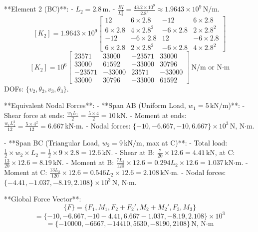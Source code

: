 **Element 2 (BC)**:
- \( L_2 = 2.8 \, \text{m} \).
- \( \frac{E I}{L_2^3} = \frac{43.2 \times 10^9}{2.8^3} \approx 1.9643 \times 10^9 \, \text{N/m} \).
\[
[K_2] = 1.9643 \times 10^9 \begin{bmatrix}
12 & 6 \times 2.8 & -12 & 6 \times 2.8 \\
6 \times 2.8 & 4 \times 2.8^2 & -6 \times 2.8 & 2 \times 2.8^2 \\
-12 & -6 \times 2.8 & 12 & -6 \times 2.8 \\
6 \times 2.8 & 2 \times 2.8^2 & -6 \times 2.8 & 4 \times 2.8^2
\end{bmatrix}
\]
\[
[K_2] = 10^6 \begin{bmatrix}
23571 & 33000 & -23571 & 33000 \\
33000 & 61592 & -33000 & 30796 \\
-23571 & -33000 & 23571 & -33000 \\
33000 & 30796 & -33000 & 61592
\end{bmatrix} \, \text{N/m or N·m}
\]
DOFs: \( \{ v_2, \theta_2, v_3, \theta_3 \} \).

**Equivalent Nodal Forces**:
- **Span AB (Uniform Load, \( w_1 = 5 \, \text{kN/m} \))**:
  - Shear force at ends: \( \frac{w_1 L_1}{2} = \frac{5 \times 4}{2} = 10 \, \text{kN} \).
  - Moment at ends: \( \frac{w_1 L_1^2}{12} = \frac{5 \times 4^2}{12} = 6.667 \, \text{kN·m} \).
  - Nodal forces: \( \{ -10, -6.667, -10, 6.667 \} \times 10^3 \, \text{N, N·m} \).

- **Span BC (Triangular Load, \( w_2 = 9 \, \text{kN/m} \), max at C)**:
  - Total load: \( \frac{1}{2} \times w_2 \times L_2 = \frac{1}{2} \times 9 \times 2.8 = 12.6 \, \text{kN} \).
  - Shear at B: \( \frac{7}{20} \times 12.6 = 4.41 \, \text{kN} \), at C: \( \frac{13}{20} \times 12.6 = 8.19 \, \text{kN} \).
  - Moment at B: \( \frac{7 L_2}{120} \times 12.6 = 0.294 L_2 \times 12.6 = 1.037 \, \text{kN·m} \).
  - Moment at C: \( \frac{13 L_2}{120} \times 12.6 = 0.546 L_2 \times 12.6 = 2.108 \, \text{kN·m} \).
  - Nodal forces: \( \{ -4.41, -1.037, -8.19, 2.108 \} \times 10^3 \, \text{N, N·m} \).

**Global Force Vector**:
\[
\{ F \} = \{ F_1, M_1, F_2 + F_2', M_2 + M_2', F_3, M_3 \}
\]
\[
= \{ -10, -6.667, -10 - 4.41, 6.667 - 1.037, -8.19, 2.108 \} \times 10^3
\]
\[
= \{ -10000, -6667, -14410, 5630, -8190, 2108 \} \, \text{N, N·m}
\]

